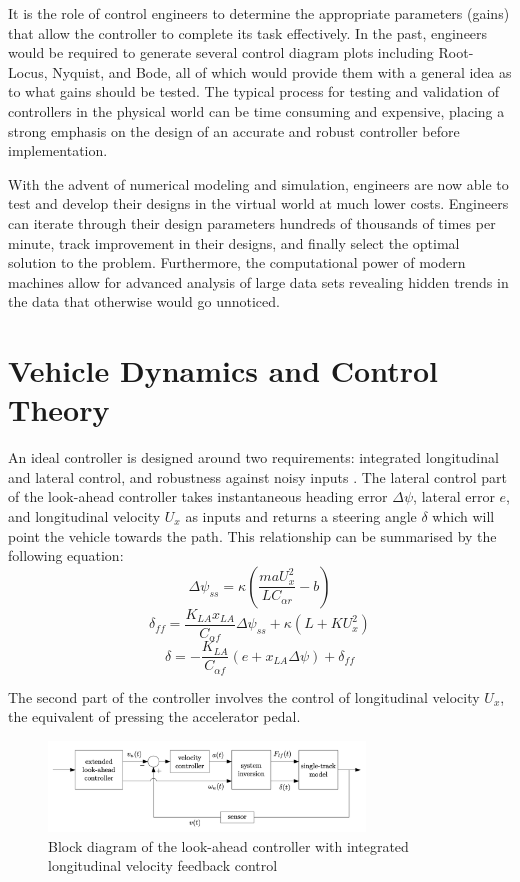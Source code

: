\documentclass[conf]{new-aiaa}
\begin{document}
It is the role of control engineers to determine the appropriate parameters (gains) that allow the controller to complete its task effectively. In the past, engineers would be required to generate several control diagram plots including Root-Locus, Nyquist, and Bode, all of which would provide them with a general idea as to what gains should be tested. The typical process for testing and validation of controllers in the physical world can be time consuming and expensive, placing a strong emphasis on the design of an accurate and robust controller before implementation.

With the advent of numerical modeling and simulation, engineers are now able to test and develop their designs in the virtual world at much lower costs. Engineers can iterate through their design parameters hundreds of thousands of times per minute, track improvement in their designs, and finally select the optimal solution to the problem. Furthermore, the computational power of modern machines allow for advanced analysis of large data sets revealing hidden trends in the data that otherwise would go unnoticed.

\section{Vehicle Dynamics and Control Theory}
An ideal controller is designed around two requirements: integrated longitudinal and lateral control, and robustness against noisy inputs \cite{bayuwindra2019look}. The lateral control part of the look-ahead controller takes instantaneous heading error $\Delta\psi$, lateral error $e$, and longitudinal velocity $U_x$ as inputs and returns a steering angle $\delta$ which will point the vehicle towards the path. This relationship can be summarised by the following equation:
\[\Delta\psi_{ss}=\kappa(\frac{maU_x^2}{LC_{{\alpha}r}}-b)\]
\[\delta_{ff}=\frac{K_{LA}x_{LA}}{C_{{\alpha}f}}\Delta\psi_{ss} + \kappa(L+KU_x^2)\]
\[\delta=-\frac{K_{LA}}{C_{{\alpha}f}}(e+x_{LA}\Delta\psi)+\delta_{ff}\]

The second part of the controller involves the control of longitudinal velocity $U_x$, the equivalent of pressing the accelerator pedal.

\begin{figure}[hbt!]
\centering
\includegraphics[width=0.75\textwidth]{lookahead_fb}
\caption{Block diagram of the look-ahead controller with integrated longitudinal velocity feedback control\cite{bayuwindra2019look}}
\end{figure}
\end{document}
